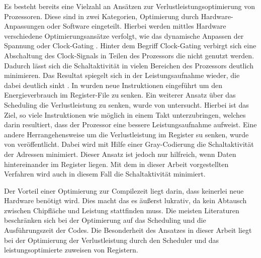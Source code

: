 Es besteht bereits eine Vielzahl an Ansätzen zur Verlustleistungsoptimierung von Prozessoren. Diese sind in zwei Kategorien, Optimierung durch Hardware-Anpassungen\cite{wu2000clock, horowitz1994low, hajj1998architectural} oder Software \cite{gebotys1997low, asanovic2000energy, toburen1998instruction, su1995cache }eingeteilt. Hierbei werden mittles Hardware verschiedene Optimierungsansätze verfolgt, wie das dynamische Anpassen der Spannung \cite{horowitz1994low} oder Clock-Gating \cite{wu2000clock}. Hinter dem Begriff Clock-Gating verbirgt sich eine Abschaltung des Clock-Signals in Teilen des Prozessors die nicht genutzt werden. Dadurch lässt sich die Schaltaktivität in vielen Bereichen des Prozessors deutlich minimieren. Das Resultat spiegelt sich in der Leistungsaufnahme wieder, die dabei deutlich sinkt \cite{donno2003clock}. In \cite{asanovic2000energy} wurden neue Instruktionen eingeführt um den Energieverbrauch im Register-File zu senken. Ein weiterer Ansatz über das Scheduling die Verlustleistung zu senken, wurde von\cite{toburen1998instruction} untersucht. Hierbei ist das Ziel, so viele Instruktionen wie möglich in einem Takt unterzubringen, welches darin resultiert, dass der Prozessor eine bessere Leistungsaufnahme aufweist.
Eine andere Herrangehensweise um die Verlustleistung im Register su senken, wurde von \cite{su1995cache} veröffentlicht. Dabei wird mit Hilfe einer Gray-Codierung die Schaltaktivität der Adressen minimiert. Dieser Ansatz ist jedoch nur hilfreich, wenn Daten hintereinander im Register liegen. Mit dem in dieser Arbeit vorgestellten Verfahren wird auch in diesem Fall die Schaltaktivität minimiert.

Der Vorteil einer Optimierung zur Compilezeit liegt darin, dass keinerlei neue Hardware benötigt wird. Dies macht das es äußerst lukrativ, da kein Abtausch zwischen Chipfläche und Leistung stattfinden muss. Die meisten Literaturen beschränken sich bei der Optimierung auf das Scheduling und die Ausführungszeit der Codes. Die Besonderheit des Ansatzes in dieser Arbeit liegt bei der Optimierung der Verlustleistung durch den Scheduler und das leistungsoptimierte zuweisen von Registern.

